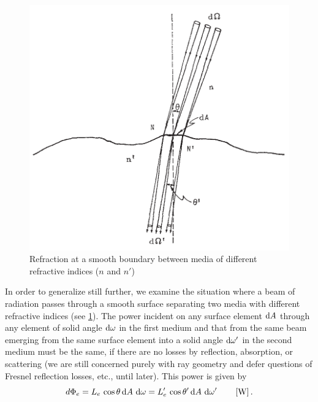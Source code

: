 \begin{refsection}
\begin{figure}
\begin{center}
\includegraphics{figures_built/nicodemus1963-fig3.pdf}	
\end{center}
\caption{Refraction at a smooth boundary between media of
different refractive indices ($n$ and $n'$)}
\label{fig:nicodemus3}
\end{figure}

In order to generalize still further, we examine the situation where a beam of
radiation passes through a smooth surface separating two media with different
refractive indices (see \cref{fig:nicodemus3}). The power incident on any
surface element $\mathop{}\!\mathrm{d} A$ through any element of solid angle $\mathop{}\!\mathrm{d} \omega$ in the first
medium and that from the same beam emerging from the same surface element into
a solid angle $\mathop{}\!\mathrm{d} \omega'$ in the second medium must be the same, if there are no
losses by reflection, absorption, or scattering (we are still concerned purely
with ray geometry and defer questions of Fresnel reflection losses, etc., until
later). This power is given by
\begin{equation}\label{eqn:nicodemus13}
d\Phi_e = L_e\,\cos\theta \d A\, \d \omega = L_e'\,\cos\theta' \d A\, \d \omega'
\qquad \left[\unit{\watt}\right].
\end{equation}


\end{refsection}
